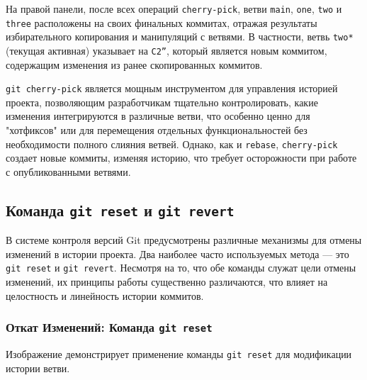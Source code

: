 На правой панели, после всех операций \texttt{cherry-pick}, ветви \texttt{main}, \texttt{one}, \texttt{two} и \texttt{three} расположены на своих финальных коммитах, отражая результаты избирательного копирования и манипуляций с ветвями.
В частности, ветвь \texttt{two*} (текущая активная) указывает на \texttt{C2''}, который является новым коммитом, содержащим изменения из ранее скопированных коммитов.

\texttt{git cherry-pick} является мощным инструментом для управления историей проекта, позволяющим разработчикам тщательно контролировать, какие изменения интегрируются в различные ветви, что особенно ценно для "хотфиксов" или для перемещения отдельных функциональностей без необходимости полного слияния ветвей.
Однако, как и \texttt{rebase}, \texttt{cherry-pick} создает новые коммиты, изменяя историю, что требует осторожности при работе с опубликованными ветвями.

\subsection{Команда \texttt{git reset} и \texttt{git revert}}\label{subsec:lgb-reset-and-revert}
В системе контроля версий Git предусмотрены различные механизмы для отмены изменений в истории проекта.
Два наиболее часто используемых метода — это \texttt{git reset} и \texttt{git revert}.
Несмотря на то, что обе команды служат цели отмены изменений, их принципы работы существенно различаются, что влияет на целостность и линейность истории коммитов.

\subsubsection{Откат Изменений: Команда \texttt{git reset}}\label{subsubsec:git-reset}
Изображение  демонстрирует применение команды \texttt{git reset} для модификации истории ветви.

\label{fig:lgb_reset_revert}

